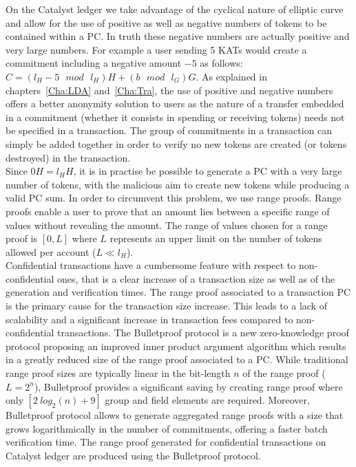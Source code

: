 On the Catalyst ledger we take advantage of the cyclical nature of elliptic curve and allow for the use of positive as well as negative numbers of tokens to be contained within a PC. In truth these negative numbers are actually positive and very large numbers. For example a user sending 5 KATs would create a commitment including a negative amount $-5$ as follows: $C = (l_H - 5 \text{ $mod$ } l_H) H + (b \text{ $mod$ } l_G) G$. As explained in chapters~\ref{Cha:LDA} and~\ref{Cha:Tra}, the use of positive and negative numbers offers a better anonymity solution to users as the nature of a transfer embedded in a commitment (whether it consists in spending or receiving tokens) needs not be specified in a transaction. The group of commitments in a transaction can simply be added together in order to verify no new tokens are created (or tokens destroyed) in the transaction. \\

Since $0H=l_HH$, it is in practise be possible to generate a PC with a very large number of tokens, with the malicious aim to create new tokens while producing a valid PC sum. In order to circumvent this problem, we use range proofs. Range proofs enable a user to prove that an amount lies between a specific range of values without revealing the amount. The range of values chosen for a range proof is $[0,L]$ where $L$ represents an upper limit on the number of tokens allowed per account ($L \ll l_H$).\\

Confidential transactions have a cumbersome feature with respect to non-confidential ones, that is a clear increase of a transaction size as well as of the generation and verification times. The range proof associated to a transaction PC is the primary cause for the transaction size increase. This leads to a lack of scalability and a significant increase in transaction fees compared to non-confidential transactions. The Bulletproof protocol is a new zero-knowledge proof protocol \cite{bulletproof} proposing an improved inner product argument algorithm which results in a greatly reduced size of the range proof associated to a PC.  While traditional range proof sizes are typically linear in the bit-length $n$ of the range proof ($L = 2^n$), Bulletproof provides a significant saving by creating range proof where only $[2~log_2(n) + 9]$ group and field elements are required. Moreover, Bulletproof protocol allows to generate aggregated range proofs with a size that grows logarithmically in the number of commitments, offering a faster batch verification time.  The range proof generated for confidential transactions on Catalyst ledger are produced using the Bulletproof protocol. 

